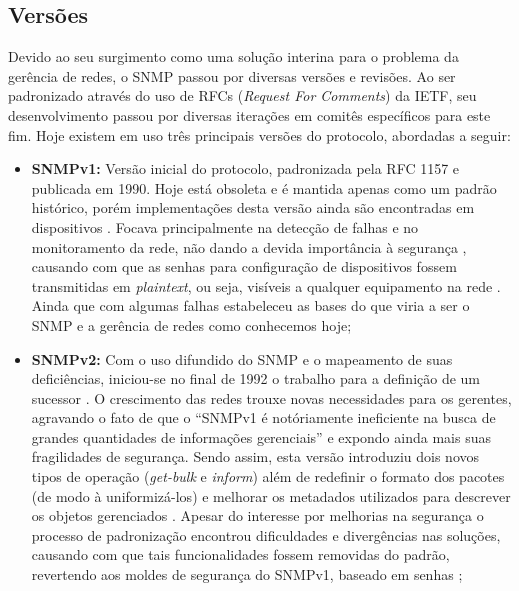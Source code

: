 \documentclass[twoside,english,brazilian]{UNISINOSmonografia}
\begin{document}
\subsection{Versões}

Devido ao seu surgimento como uma solução interina para o problema da gerência 
de redes, o SNMP passou por diversas versões e revisões.
Ao ser padronizado através do uso de RFCs (\textit{Request For Comments}) 
da IETF, seu desenvolvimento passou por diversas iterações em comitês 
específicos para este fim.
Hoje existem em uso três principais versões do protocolo, abordadas a seguir:

\begin{itemize}
\item \textbf{SNMPv1:}
Versão inicial do protocolo, padronizada pela RFC 1157
e publicada em 1990. 
Hoje está obsoleta e é mantida apenas como um padrão histórico, porém 
implementações desta versão ainda são encontradas em dispositivos 
\cite{Mauro2009,Ding2009}.
Focava principalmente na detecção de falhas e no monitoramento da rede, não 
dando a devida importância à segurança \cite{Clemm2006}, causando com que as 
senhas para configuração de dispositivos fossem transmitidas em 
\textit{plaintext}, ou seja, visíveis a qualquer equipamento na rede 
\cite{Hunt1997,Ding2009}.
Ainda que com algumas falhas estabeleceu as bases do que viria a ser o SNMP 
e a gerência de redes como conhecemos hoje;

\item \textbf{SNMPv2:}
Com o uso difundido do SNMP e o mapeamento de suas deficiências, iniciou-se no 
final de 1992 o trabalho para a definição de um sucessor \cite{Hunt1997}.
O crescimento das redes trouxe novas necessidades para os gerentes, agravando 
o fato de que o ``SNMPv1 é notóriamente ineficiente na busca de grandes 
quantidades de informações gerenciais'' \cite{Clemm2006} e expondo ainda mais 
suas fragilidades de segurança.
Sendo assim, esta versão introduziu dois novos tipos de operação
(\textit{get-bulk} e \textit{inform})
além de redefinir o formato dos pacotes (de modo à uniformizá-los) e melhorar 
os metadados utilizados para descrever os objetos gerenciados 
\cite{Hunt1997,stallings1999snmp,Mauro2009}. 
Apesar do interesse por melhorias na segurança o processo de padronização 
encontrou dificuldades e divergências nas soluções, causando com que tais 
funcionalidades fossem removidas do padrão, revertendo aos moldes de segurança 
do SNMPv1, baseado em senhas \cite{Clemm2006,Ding2009};


\end{itemize}
\end{document}
